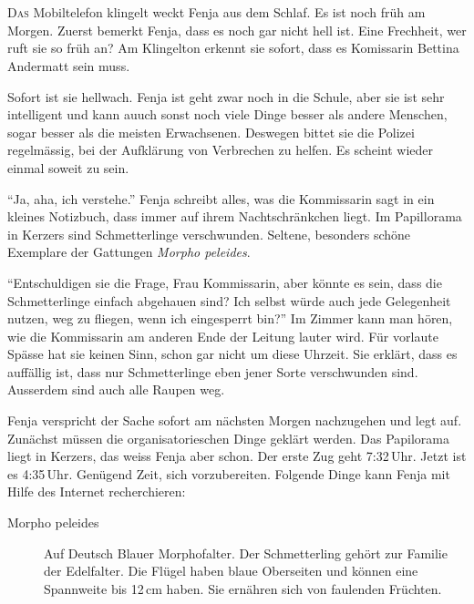 \chapter*{}
\lettrine[lines=3]{\color{red}D}{as} Mobiltelefon klingelt weckt Fenja aus dem Schlaf. Es ist noch früh am Morgen. Zuerst bemerkt Fenja, dass es noch gar nicht hell ist. Eine Frechheit, wer ruft sie so früh an? Am Klingelton erkennt sie sofort, dass es Komissarin Bettina Andermatt sein muss.

Sofort ist sie hellwach. Fenja ist geht zwar noch in die Schule, aber sie ist sehr intelligent und kann auuch sonst noch viele Dinge besser als andere Menschen, sogar besser als die meisten Erwachsenen. Deswegen bittet sie die Polizei regelmässig, bei der Aufklärung von Verbrechen zu helfen. Es scheint wieder einmal soweit zu sein.

\enquote{Ja, aha, ich verstehe.} Fenja schreibt alles, was die Kommissarin sagt in ein kleines Notizbuch, dass immer auf ihrem Nachtschränkchen liegt. Im Papillorama in Kerzers sind Schmetterlinge verschwunden. Seltene, besonders schöne Exemplare der Gattungen \emph{Morpho peleides}.

\enquote{Entschuldigen sie die Frage, Frau Kommissarin, aber könnte es sein, dass die Schmetterlinge einfach abgehauen sind? Ich selbst würde auch jede Gelegenheit nutzen, weg zu fliegen, wenn ich eingesperrt bin?} Im Zimmer kann man hören, wie die Kommissarin am anderen Ende der Leitung lauter wird. Für vorlaute Spässe hat sie keinen Sinn, schon gar nicht um diese Uhrzeit. Sie erklärt, dass es auffällig ist, dass nur Schmetterlinge eben jener Sorte verschwunden sind. Ausserdem sind auch alle Raupen weg.

Fenja verspricht der Sache sofort am nächsten Morgen nachzugehen und legt auf. Zunächst müssen die organisatorieschen Dinge geklärt werden. Das Papilorama liegt in Kerzers, das weiss Fenja aber schon. Der erste Zug geht 7:32\,Uhr. Jetzt ist es 4:35\,Uhr. Genügend Zeit, sich vorzubereiten. Folgende Dinge kann Fenja mit Hilfe des Internet recherchieren:

\begin{description}
  \item[Morpho peleides] Auf Deutsch Blauer Morphofalter. Der Schmetterling gehört zur Familie der Edelfalter. Die Flügel haben blaue Oberseiten und können eine Spannweite bis 12\,cm haben. Sie ernähren sich von faulenden Früchten.
\end{description}

